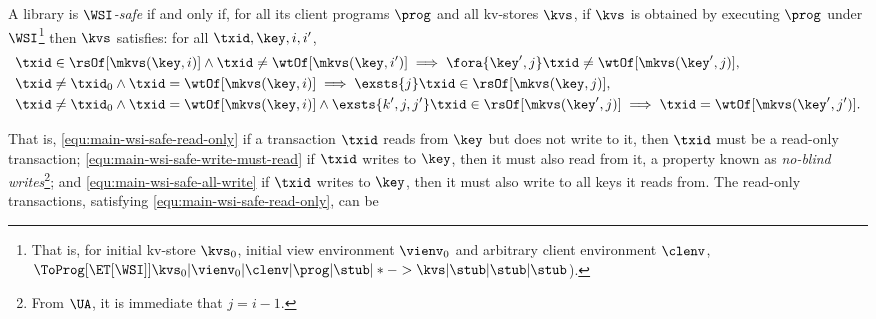 \SpaceAboveDef
\begin{definition}
\label{def:main-body-wsi-safe}
A library is \emph{\(\WSI\)-safe}
if and only if,  for all its client programs $\prog$ and all kv-stores \( \kvs \), 
if $\kvs$ is  obtained by executing \( \prog \) under
$\WSI$\footnote{That is, for initial kv-store $\kvs_0 $, initial
  view environment $\vienv_0$ and arbitrary client environment $\clenv
  $,  \( \ToProg[{\ET[\WSI]}]{\kvs_0 |\vienv_0 | \clenv | \prog |
    \stub | * -> \kvs | \stub | \stub | \stub }\)).}
then $\kvs$ satisfies:  for all $\txid, \key, i,i'$, 
%
\begin{align}
     & \txid \in \rsOf[\mkvs(\key,i)] \land \txid \neq \wtOf[\mkvs(\key,i')]  \implies \fora{\key',j} \txid \neq \wtOf[\mkvs(\key',j)] , \label{equ:main-wsi-safe-read-only} \\
     & \txid \neq \txid_0 \land \txid = \wtOf[\mkvs(\key,i)] \implies
       \exsts{j} \txid \in \rsOf[\mkvs(\key,j)]
       , \label{equ:main-wsi-safe-write-must-read}\\
     & \txid \neq \txid_0 \land \txid = \wtOf[\mkvs(\key,i)] \land \exsts{k',j,j'} \txid \in \rsOf[\mkvs(\key',j)] \implies \txid = \wtOf[\mkvs(\key',j')] . \label{equ:main-wsi-safe-all-write}
\end{align}
%
\end{definition}

That is, 
\eqref{equ:main-wsi-safe-read-only}
if a transaction $\txid$ reads from $\key$ but does not write to it, 
then $\txid$ must be a read-only transaction; 
\eqref{equ:main-wsi-safe-write-must-read}  if \( \txid \) writes to $\key$, then it must also read from it, a property known as \emph{no-blind writes}\footnote{From \(\UA\), it is immediate that $j = i-1$.}; and
\eqref{equ:main-wsi-safe-all-write}  if \( \txid \) writes to $\key$,
then it must also write to all keys it reads from. The read-only transactions, satisfying \eqref{equ:main-wsi-safe-read-only}, 
can be 


